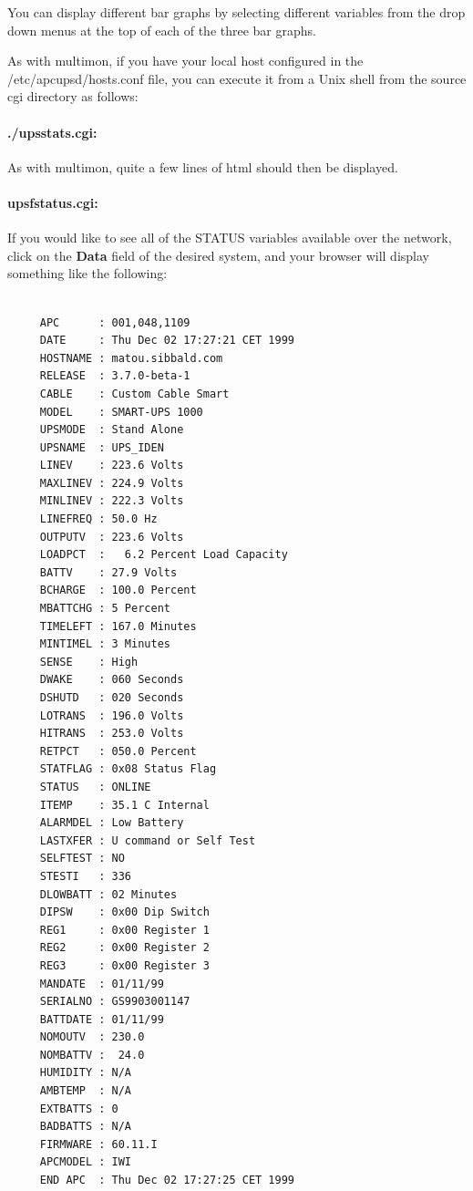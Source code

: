 {{{{{{{{You can display different bar graphs by selecting different variables from the
drop down menus at the top of each of the three bar graphs.  

As with multimon, if you have your local host configured in the
/etc/apcupsd/hosts.conf file, you can execute it from a Unix shell from the
source cgi directory as follows: 

\label{_005f_002fupsstats_005fcgi}

\paragraph*{./upsstats.cgi:}

\label{index-upssstats-130}
\label{index-CGI_002c-upssstats-131}
As with multimon, quite a few lines of html should then be displayed. 

\label{upsfstatus_005fcgi}

\paragraph*{upsfstatus.cgi:}

\label{index-upsfstatus-132}
\label{index-CGI_002c-upsfstatus-133}
If you would like to see all of the STATUS variables available over the
network, click on the {\bf Data} field of the desired system, and your browser
will display something like the following: 

\footnotesize
\begin{verbatim}
     
     APC      : 001,048,1109
     DATE     : Thu Dec 02 17:27:21 CET 1999
     HOSTNAME : matou.sibbald.com
     RELEASE  : 3.7.0-beta-1
     CABLE    : Custom Cable Smart
     MODEL    : SMART-UPS 1000
     UPSMODE  : Stand Alone
     UPSNAME  : UPS_IDEN
     LINEV    : 223.6 Volts
     MAXLINEV : 224.9 Volts
     MINLINEV : 222.3 Volts
     LINEFREQ : 50.0 Hz
     OUTPUTV  : 223.6 Volts
     LOADPCT  :   6.2 Percent Load Capacity
     BATTV    : 27.9 Volts
     BCHARGE  : 100.0 Percent
     MBATTCHG : 5 Percent
     TIMELEFT : 167.0 Minutes
     MINTIMEL : 3 Minutes
     SENSE    : High
     DWAKE    : 060 Seconds
     DSHUTD   : 020 Seconds
     LOTRANS  : 196.0 Volts
     HITRANS  : 253.0 Volts
     RETPCT   : 050.0 Percent
     STATFLAG : 0x08 Status Flag
     STATUS   : ONLINE
     ITEMP    : 35.1 C Internal
     ALARMDEL : Low Battery
     LASTXFER : U command or Self Test
     SELFTEST : NO
     STESTI   : 336
     DLOWBATT : 02 Minutes
     DIPSW    : 0x00 Dip Switch
     REG1     : 0x00 Register 1
     REG2     : 0x00 Register 2
     REG3     : 0x00 Register 3
     MANDATE  : 01/11/99
     SERIALNO : GS9903001147
     BATTDATE : 01/11/99
     NOMOUTV  : 230.0
     NOMBATTV :  24.0
     HUMIDITY : N/A
     AMBTEMP  : N/A
     EXTBATTS : 0
     BADBATTS : N/A
     FIRMWARE : 60.11.I
     APCMODEL : IWI
     END APC  : Thu Dec 02 17:27:25 CET 1999
\end{verbatim}
\normalsize

}}}}}}}}
